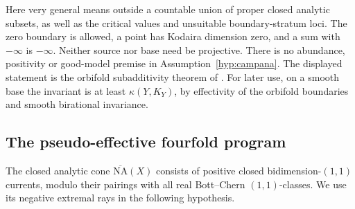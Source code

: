 \documentclass[11pt,letterpaper]{article}
\newcommand{\NA}{\overline{\mathrm{NA}}}
\theoremstyle{definition}
\theoremstyle{remark}
\begin{document}
Here very general means outside a countable union of proper closed
analytic subsets, as well as the critical values and unsuitable
boundary-stratum loci. The zero boundary is allowed, a point has
Kodaira dimension zero, and a sum with \(-\infty\) is
\(-\infty\). Neither source nor base need be projective. There is
no abundance, positivity or good-model premise in
Assumption~\ref{hyp:campana}. The displayed statement is the orbifold
subadditivity theorem of \cite[Theorem~1.1]{GrantCampana}. For later use,
on a smooth base the invariant
is at least \(\kappa(Y,K_Y)\), by effectivity of the orbifold
boundaries and smooth birational invariance.

\subsection{The pseudo-effective fourfold program}

The closed analytic cone \(\NA(X)\) consists of positive closed
bidimension-\((1,1)\) currents, modulo their pairings with all real
Bott--Chern \((1,1)\)-classes. We use its negative extremal rays in
the following hypothesis.
\end{document}
